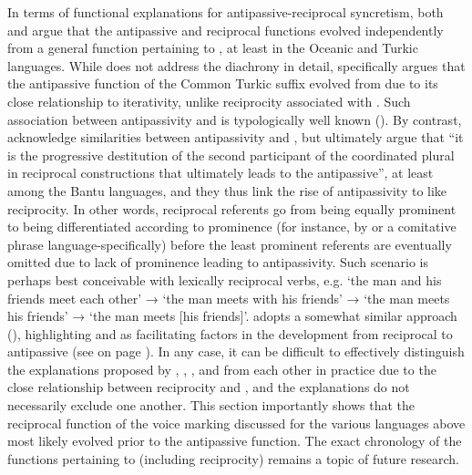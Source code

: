In terms of functional explanations for antipassive-reciprocal syncretism, both \cite{janic:2016} and \cite{gandon:2018} argue that the antipassive and reciprocal functions evolved independently from a general function pertaining to , at least in the Oceanic and Turkic languages. While \cite{janic:2016} does not address the diachrony in detail, \cite{gandon:2018} specifically argues that the antipassive function of the Common Turkic suffix  evolved from  due to its close relationship to iterativity, unlike reciprocity associated with . Such association between antipassivity and  is typologically well known (\citealt{polinsky:2017}). By contrast, \cite[759]{bostoen:al:2015} acknowledge similarities between antipassivity and , but ultimately argue that “it is the progressive destitution of the second participant of the coordinated plural  in reciprocal constructions that ultimately leads to the antipassive”, at least among the Bantu languages, and they thus link the rise of antipassivity to  like reciprocity. In other words, reciprocal referents go from being equally prominent to being differentiated according to prominence (for instance, by  or a comitative phrase language-specifically) before the least prominent referents are eventually omitted due to lack of prominence leading to antipassivity. Such scenario is perhaps best conceivable with lexically reciprocal verbs, e.g. ‘the man and his friends meet each other’ → ‘the man meets with his friends’ → ‘the man meets his friends’ → ‘the man meets [his friends]’. \cite{sanso:2017, sanso:2018} adopts a somewhat similar approach (), highlighting  and  as facilitating factors in the development from reciprocal to antipassive (see  on page \pageref{fig:ch7:antp-refl}). In any case, it can be difficult to effectively distinguish the explanations proposed by \cite{janic:2016}, \cite{gandon:2018}, \cite{bostoen:al:2015}, and \cite{sanso:2017, sanso:2018} from each other in practice due to the close relationship between reciprocity and , and the explanations do not necessarily exclude one another. This section importantly shows that the reciprocal function of the voice marking discussed for the various languages above most likely evolved prior to the antipassive function. The exact chronology of the functions pertaining to  (including reciprocity) remains a topic of future research.

